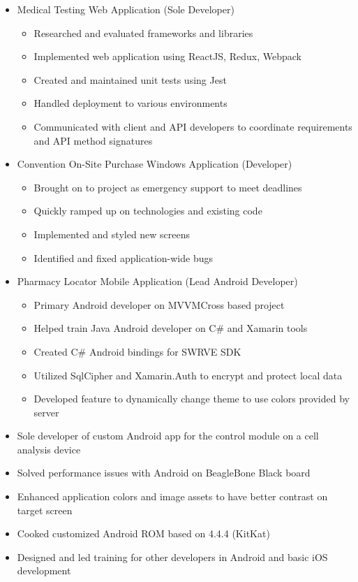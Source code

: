 \documentclass[12pt,letterpaper,sans]{moderncv}
\begin{document}
    \begin{itemize}[leftmargin=1.24in]
    	\item Medical Testing Web Application (Sole Developer)
	    	\begin{itemize}
	    		\item Researched and evaluated frameworks and libraries
	    		\item Implemented web application using ReactJS, Redux, Webpack
	    		\item Created and maintained unit tests using Jest
	    		\item Handled deployment to various environments
	    		\item Communicated with client and API developers to coordinate requirements and API method signatures
	    	\end{itemize} 
    	\item Convention On-Site Purchase Windows Application (Developer)
		    \begin{itemize}
			    \item Brought on to project as emergency support to meet deadlines
			    \item Quickly ramped up on technologies and existing code
			    \item Implemented and styled new screens
			    \item Identified and fixed application-wide bugs
			\end{itemize} 
    	\item Pharmacy Locator Mobile Application (Lead Android Developer)
	    	\begin{itemize}
		    	\item Primary Android developer on MVVMCross based project
		    	\item Helped train Java Android developer on C\# and Xamarin tools
		    	\item Created C\# Android bindings for SWRVE SDK
		    	\item Utilized SqlCipher and Xamarin.Auth to encrypt and protect local data
		    	\item Developed feature to dynamically change theme to use colors provided by server
		    \end{itemize} 
    \end{itemize} 
	\begin{itemize}[leftmargin=1.24in]
		\item Sole developer of custom Android app for the control module on a cell analysis device
		\item Solved performance issues with Android on BeagleBone Black board
		\item Enhanced application colors and image assets to have better contrast on target screen
		\item Cooked customized Android ROM based on 4.4.4 (KitKat)
		\item Designed and led training for other developers in Android and basic iOS development
	\end{itemize}
\end{document}
